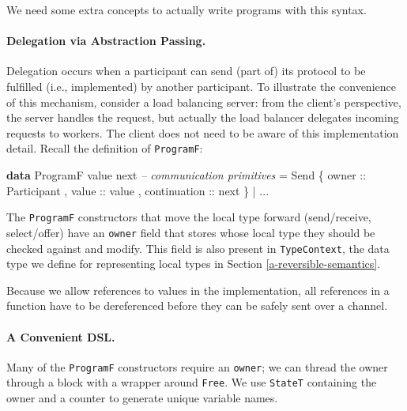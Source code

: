 \documentclass[runningheads,plain]{llncs}
\newcommand{\checkthis}[1]{#1}
\newenvironment{Shaded}{}{}
\newcommand{\KeywordTok}[1]{\textcolor[rgb]{0.00,0.44,0.13}{\textbf{#1}}}
\newcommand{\DataTypeTok}[1]{\textcolor[rgb]{0.56,0.13,0.00}{#1}}
\newcommand{\CommentTok}[1]{\textcolor[rgb]{0.38,0.63,0.69}{\textit{#1}}}
\newcommand{\OtherTok}[1]{\textcolor[rgb]{0.00,0.44,0.13}{#1}}
\newcommand{\FunctionTok}[1]{\textcolor[rgb]{0.02,0.16,0.49}{#1}}
\newcommand{\NormalTok}[1]{#1}
\begin{document}
We need some extra concepts to actually write programs with this syntax.

\paragraph{Delegation via Abstraction Passing.}\label{abstraction-passing}

Delegation occurs when a participant can send (part of)
its protocol to be fulfilled (i.e., implemented) by another participant. 
To illustrate the convenience of this mechanism, 
consider a  load balancing server: from the client's
perspective, the server handles the request, but actually the load
balancer delegates incoming requests to workers. The client does not
need to be aware of this implementation detail.
Recall the definition of \texttt{ProgramF}:
\begin{Shaded}
\begin{Highlighting}[]
\KeywordTok{data} \DataTypeTok{ProgramF}\NormalTok{ value next }
    \CommentTok{-- communication primitives}
    \FunctionTok{=} \DataTypeTok{Send} 
\NormalTok{        \{}\OtherTok{ owner ::} \DataTypeTok{Participant}
\NormalTok{        ,}\OtherTok{ value ::}\NormalTok{ value}
\NormalTok{        ,}\OtherTok{ continuation ::}\NormalTok{ next }
\NormalTok{        \}}
    \FunctionTok{|} \FunctionTok{...} 
\end{Highlighting}
\end{Shaded}
The \texttt{ProgramF} constructors that move the local type forward
(send/receive, select/offer) have an \texttt{owner} field that stores
whose local type they should be checked against and modify. This field is
also present in \texttt{TypeContext}, the data type we define for representing local types in Section \ref{a-reversible-semantics}. 

Because we allow references to values in the implementation, all
references in a function have to be dereferenced before they can be safely
sent over a channel.

\paragraph{A Convenient DSL.}\label{high-level-dsl}
\checkthis{
Many of the \texttt{ProgramF} constructors require an \texttt{owner}; we
can thread the owner through a block with a wrapper around
\texttt{Free}. We use \texttt{StateT} containing the owner and a counter
to generate unique variable names.}
\end{document}
